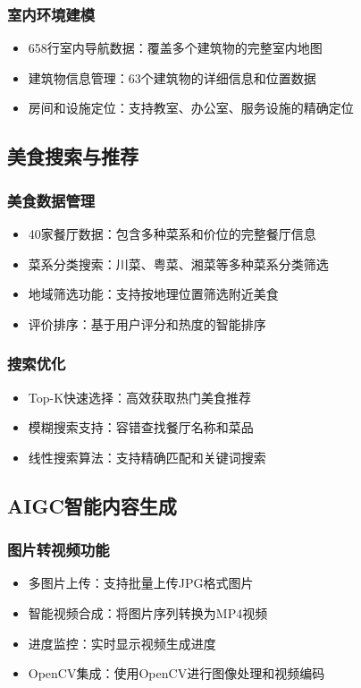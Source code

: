 \documentclass[12pt,a4paper]{article}
\begin{document}
\subsubsection{室内环境建模}
\begin{itemize}
    \item 658行室内导航数据：覆盖多个建筑物的完整室内地图
    \item 建筑物信息管理：63个建筑物的详细信息和位置数据
    \item 房间和设施定位：支持教室、办公室、服务设施的精确定位
\end{itemize}

\subsection{美食搜索与推荐}
\subsubsection{美食数据管理}
\begin{itemize}
    \item 40家餐厅数据：包含多种菜系和价位的完整餐厅信息
    \item 菜系分类搜索：川菜、粤菜、湘菜等多种菜系分类筛选
    \item 地域筛选功能：支持按地理位置筛选附近美食
    \item 评价排序：基于用户评分和热度的智能排序
\end{itemize}

\subsubsection{搜索优化}
\begin{itemize}
    \item Top-K快速选择：高效获取热门美食推荐
    \item 模糊搜索支持：容错查找餐厅名称和菜品
    \item 线性搜索算法：支持精确匹配和关键词搜索
\end{itemize}

\subsection{AIGC智能内容生成}
\subsubsection{图片转视频功能}
\begin{itemize}
    \item 多图片上传：支持批量上传JPG格式图片
    \item 智能视频合成：将图片序列转换为MP4视频
    \item 进度监控：实时显示视频生成进度
    \item OpenCV集成：使用OpenCV进行图像处理和视频编码
\end{itemize}
\end{document}
